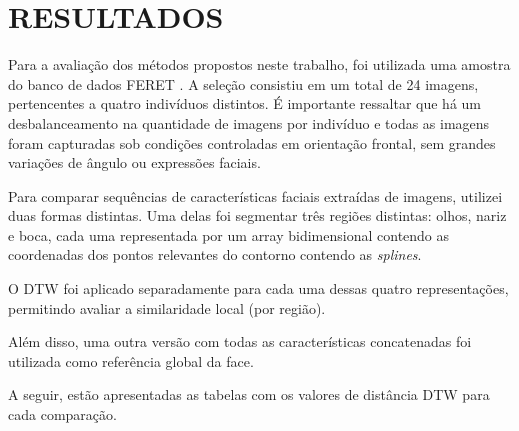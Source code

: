\chapter{RESULTADOS} \label{cha:resultados}

Para a avaliação dos métodos propostos neste trabalho, foi utilizada uma amostra do banco de dados FERET \cite{FERET1,FERET2}. A seleção consistiu em um total de 24 imagens, pertencentes a quatro indivíduos distintos. É importante ressaltar que há um desbalanceamento na quantidade de imagens por indivíduo e todas as imagens foram capturadas sob condições controladas em orientação frontal, sem grandes variações de ângulo ou expressões faciais.


Para comparar sequências de características faciais extraídas de imagens, utilizei duas formas distintas. Uma delas foi segmentar três regiões distintas: olhos, nariz e boca, cada uma representada por um array bidimensional contendo as coordenadas dos pontos relevantes do contorno contendo as \textit{splines}.

O DTW foi aplicado separadamente para cada uma dessas quatro representações, permitindo avaliar a similaridade local (por região).

Além disso, uma outra versão com todas as características concatenadas foi utilizada como referência global da face.

A seguir, estão apresentadas as tabelas com os valores de distância DTW para cada comparação.


